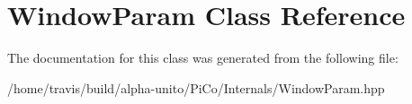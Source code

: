 \hypertarget{class_window_param}{\section{\-Window\-Param \-Class \-Reference}
\label{class_window_param}
}


\-The documentation for this class was generated from the following file\-:\begin{DoxyCompactItemize}
\item 
/home/travis/build/alpha-\/unito/\-Pi\-Co/\-Internals/\-Window\-Param.\-hpp\end{DoxyCompactItemize}
